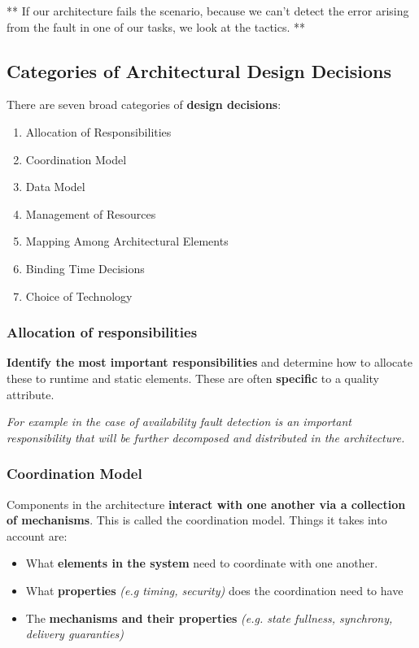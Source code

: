 \documentclass[a4paper]{article}
\begin{document}
** If our architecture fails the scenario, because we can't detect the error arising from the fault in one of our tasks, we look at the tactics. **

\subsection{Categories of Architectural Design Decisions}
There are seven broad categories of \textbf{design decisions}:

\begin{enumerate}
\item Allocation of Responsibilities
\item Coordination Model
\item Data Model
\item Management of Resources
\item Mapping Among Architectural Elements
\item Binding Time Decisions
\item Choice of Technology
\end{enumerate}


\subsubsection{Allocation of responsibilities}
\textbf{Identify the most important responsibilities} and determine how to allocate these to runtime and static elements. These are often \textbf{specific} to a quality attribute. 

\textit{For example in the case of availability fault detection is an important responsibility that will be further decomposed and distributed in the architecture.}


\subsubsection{Coordination Model}
Components in the architecture \textbf{interact with one another via a collection of mechanisms}. This is called the coordination model. Things it takes into account are:
\begin{itemize}
\item What \textbf{elements in the system} need to coordinate with one another.
\item What \textbf{properties} \textit{(e.g timing, security)} does the coordination need to have
\item The \textbf{mechanisms and their properties} \textit{(e.g. state fullness, synchrony, delivery guaranties)}
\end{itemize}
\end{document}
